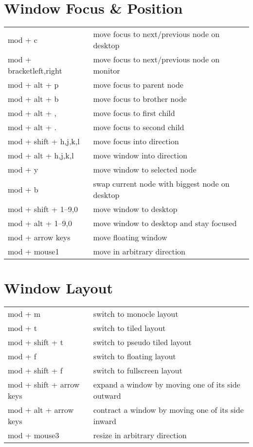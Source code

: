 \documentclass[
    10pt,
    a4paper,
    notitlepage,
]{scrartcl}
\begin{document}
\section{Window Focus \& Position}
\begin{tabular}{p{4cm}l}
    mod + c                   & move focus to next/previous node on desktop    \\
    mod + bracket{left,right} & move focus to next/previous node on monitor    \\
    mod + alt + p             & move focus to parent node                      \\
    mod + alt + b             & move focus to brother node                     \\
    mod + alt + ,             & move focus to first child                      \\
    mod + alt + .             & move focus to second child                     \\
    mod + shift + h,j,k,l     & move focus into direction                      \\
    mod + alt + h,j,k,l       & move window into direction                     \\
    mod + y                   & move window to selected node                   \\
    mod + b                   & swap current node with biggest node on desktop \\
    mod + shift + 1--9,0      & move window to desktop                         \\
    mod + alt + 1--9,0        & move window to desktop and stay focused        \\
    mod + arrow keys          & move floating window                           \\
    mod + mouse1              & move in arbitrary direction
\end{tabular}

\section{Window Layout}
\begin{tabular}{p{4cm}l}
    mod + m                         & switch to monocle layout                           \\
    mod + t                         & switch to tiled layout                             \\
    mod + shift + t                 & switch to pseudo tiled layout                      \\
    mod + f                         & switch to floating layout                          \\
    mod + shift + f                 & switch to fullscreen layout                        \\
    mod + shift + arrow keys        & expand a window by moving one of its side outward  \\
    mod + alt + arrow keys          & contract a window by moving one of its side inward \\
    mod + mouse3                    & resize in arbitrary direction
\end{tabular}
\end{document}
